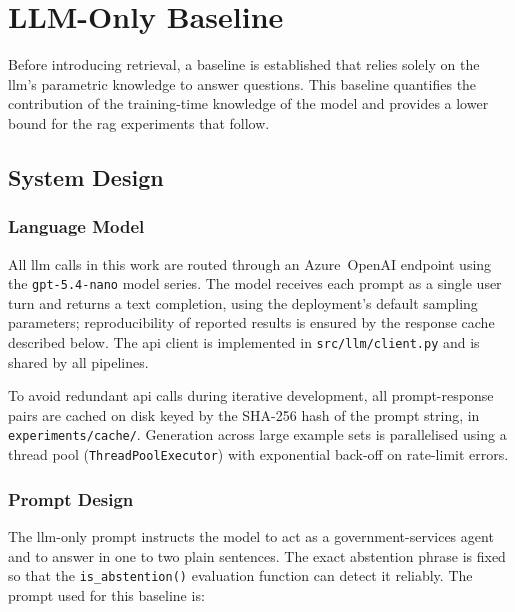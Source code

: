 
\chapter{LLM-Only Baseline}\label{ch:llm_baseline}

Before introducing retrieval, a baseline is established that relies solely on the
\gls{llm}'s parametric knowledge to answer questions. This baseline quantifies the
contribution of the training-time knowledge of the model and provides a lower bound
for the \gls{rag} experiments that follow.


\section{System Design}

\subsection{Language Model}

All \gls{llm} calls in this work are routed through an Azure~OpenAI endpoint
using the \texttt{gpt-5.4-nano} model series. The model receives each prompt as a
single user turn and returns a text completion, using the deployment's default
sampling parameters; reproducibility of reported results is ensured by the response
cache described below. The \gls{api} client is implemented in
\texttt{src/llm/client.py} and is shared by all pipelines.

To avoid redundant \gls{api} calls during iterative development, all prompt-response
pairs are cached on disk keyed by the SHA-256 hash of the prompt string, in
\texttt{experiments/cache/}. Generation across large example sets is parallelised
using a thread pool (\texttt{ThreadPoolExecutor}) with exponential back-off on
rate-limit errors.

\subsection{Prompt Design}

The \gls{llm}-only prompt instructs the model to act as a government-services agent
and to answer in one to two plain sentences. The exact abstention phrase is fixed
so that the \texttt{is\_abstention()} evaluation function can detect it reliably.
The prompt used for this baseline is:

